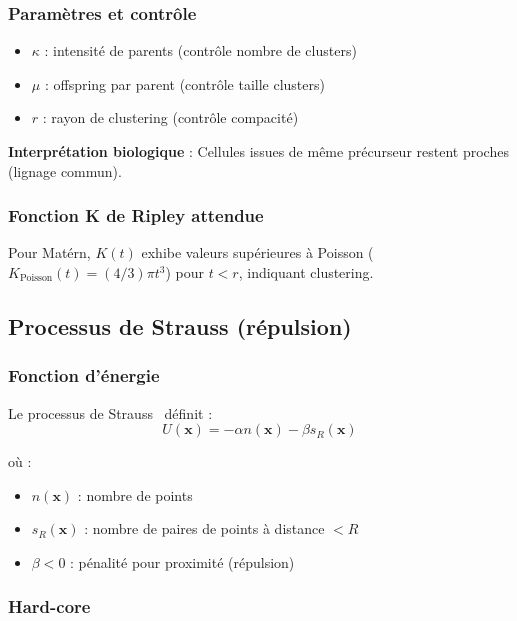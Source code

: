 \subsubsection{Paramètres et contrôle}

\begin{itemize}
    \item $\kappa$ : intensité de parents (contrôle nombre de clusters)
    \item $\mu$ : offspring par parent (contrôle taille clusters)
    \item $r$ : rayon de clustering (contrôle compacité)
\end{itemize}

\textbf{Interprétation biologique} : Cellules issues de même précurseur restent proches (lignage commun).

\subsubsection{Fonction K de Ripley attendue}

Pour Matérn, $K(t)$ exhibe valeurs supérieures à Poisson ($K_{\text{Poisson}}(t) = (4/3)\pi t^3$) pour $t < r$, indiquant clustering.

\subsection{Processus de Strauss (répulsion)}

\subsubsection{Fonction d'énergie}

Le processus de Strauss~\cite{Strauss1975} définit :
\[
U(\mathbf{x}) = -\alpha n(\mathbf{x}) - \beta s_R(\mathbf{x})
\]

où :
\begin{itemize}
    \item $n(\mathbf{x})$ : nombre de points
    \item $s_R(\mathbf{x})$ : nombre de paires de points à distance $< R$
    \item $\beta < 0$ : pénalité pour proximité (répulsion)
\end{itemize}

\subsubsection{Hard-core}

